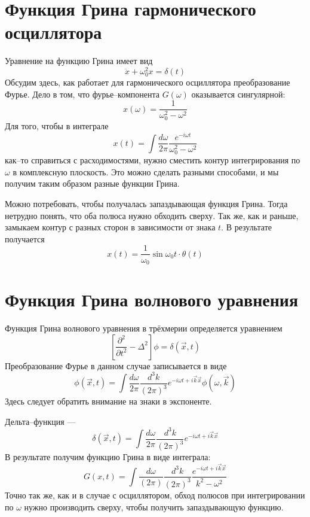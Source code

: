 \documentclass{article}
\begin{document}
\section{Функция Грина гармонического осциллятора}
Уравнение на функцию Грина имеет вид
\begin{equation}
    \ddot{x} + \omega_0^2 x = \delta(t)
\end{equation}
Обсудим здесь, как работает для гармонического осциллятора преобразование
Фурье. Дело в том, что фурье--компонента $G(\omega)$ оказывается сингулярной:
\begin{equation}
    x(\omega) = \frac{1}{\omega_0^2 - \omega^2}
\end{equation}
Для того, чтобы в интеграле
\begin{equation}
    x(t) = \int \frac{d\omega}{2\pi} \frac{e^{-i\omega t}}{\omega_0^2 - \omega^2}
\end{equation}
как--то справиться с расходимостями, нужно сместить контур интегрирования по $\omega$ 
в комплексную плоскость. Это можно сделать разными способами, и мы получим таким образом
разные функции Грина. 

Можно потребовать, чтобы получалась запаздывающая функция Грина. Тогда нетрудно понять,
что оба полюса нужно обходить сверху. Так же, как и раньше, замыкаем контур с разных сторон
в зависимости от знака $t$. В результате получается 
\begin{equation}
    x(t) = \frac{1}{\omega_0}\sin{\omega_0 t}\cdot\theta(t)
\end{equation}

\section{Функция Грина волнового уравнения}
Функция Грина волнового уравнения в трёхмерии определяется уравнением 
\begin{equation}
    \left[\frac{\partial^2}{\partial t^2} -  \Delta^2 \right]\phi = \delta(\vec{x},t)
\end{equation}
Преобразование Фурье в данном случае записывается в виде
\begin{equation}
    \phi(\vec{x},t) = \int \frac{d\omega}{2\pi} \frac{d^3 k}{(2\pi)^3} 
        e^{-i\omega t + i\vec{k}\vec{x}} \phi(\omega, \vec{k})
\end{equation}
Здесь следует обратить внимание на знаки в экспоненте. 

Дельта--функция --- 
\begin{equation}
    \delta(\vec{x},t) = \int \frac{d\omega}{2\pi} \frac{d^3 k}{(2\pi)^3} 
        e^{-i\omega t + i\vec{k}\vec{x}} 
\end{equation}
В результате получим функцию Грина в виде интеграла:
\begin{equation}
    G(x,t) = \int \frac{d\omega}{(2\pi)} \frac{d^3 k}{(2\pi)^3} 
            \frac{e^{-i\omega t + i\vec{k}\vec{x}}}{k^2 - \omega^2}
\end{equation}
Точно так же, как и в случае с осциллятором,
обход полюсов при интегрировании по $\omega$ нужно производить сверху, чтобы получить
запаздывающую функцию.
\end{document}
